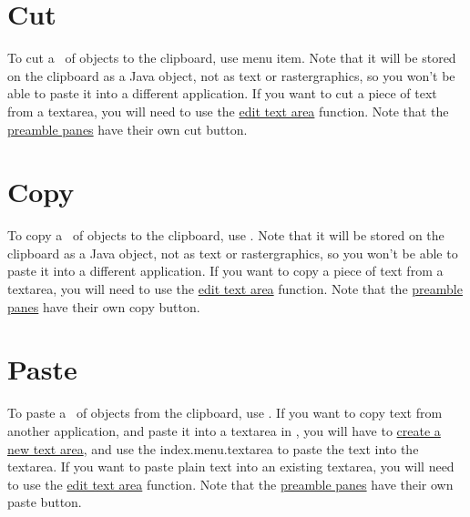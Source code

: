 
\section{Cut}\label{sec:cutobjects}


To cut a \selection\ of \glspl{object} to the
clipboard, use  menu item. Note that it will be stored
on the clipboard as a  Java object, not as text or
\gls{rastergraphics}, so you won't be able to paste it into a different
application.  If you want to cut a piece of text
from a \gls{textarea}, you will need to use the
\hyperref[sec:edittext]{edit text area} function.
Note that the \hyperref[sec:preamble]{preamble panes} have
their own cut button.

\section{Copy}\label{sec:copyobjects}


To copy a \selection\ of \glspl{object} to the
clipboard, use . Note that it will be stored
on the clipboard as a  Java object, not as text or
\gls{rastergraphics}, so you won't be able to paste it into a different
application.  If you want to copy a piece of text from a
\gls{textarea}, you will need to use the
\hyperref[sec:edittext]{edit text area} function.
Note that the \hyperref[sec:preamble]{preamble panes} have
their own copy button.

\section{Paste}\label{sec:pasteobjects}


To paste a \selection\ of \glspl{object} from the clipboard, use
. If you want to copy text from another
application, and paste it into a \gls{textarea} in \FlowframTk, you
will have to \hyperref[sec:newtext]{create a new text area}, and
use the \gls{index.menu.textarea} to paste the text into the
\gls*{textarea}.  If you want to paste plain text into an existing
\gls*{textarea}, you will need to use the
\hyperref[sec:edittext]{edit text area} function.  Note that the
\hyperref[sec:preamble]{preamble panes} have their own paste button.

